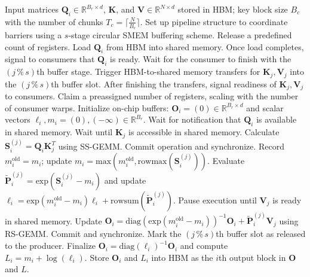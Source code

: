 \begin{enumerate}
\begin{algorithm}[H]
    \caption{\small\label{alg:flash3_wgmma_ws_only}\textsc{FlashAttention-3} forward pass \textbf{excluding} intra-consumer overlap -- CTA perspective}
    \begin{algorithmic}[1]
\REQUIRE Input matrices $\mathbf{Q}_i \in \mathbb{R}^{B_r \times d}$, $\mathbf{K}$, and $\mathbf{V} \in \mathbb{R}^{N \times d}$ stored in HBM; key block size $B_c$ with the number of chunks $T_c = \lceil \frac{N}{B_c} \rceil$.
\STATE Set up pipeline structure to coordinate barriers using a $s$-stage circular SMEM buffering scheme.
\STATE Release a predefined count of registers.
\STATE Load $\mathbf{Q}_i$ from HBM into shared memory.
\STATE Once load completes, signal to consumers that $\mathbf{Q}_i$ is ready.
    \STATE Wait for the consumer to finish with the $(j\,\%\,s)$th buffer stage.
    \STATE Trigger HBM-to-shared memory transfers for $\mathbf{K}_j, \mathbf{V}_j$ into the $(j\,\%\,s)$th buffer slot.
    \STATE After finishing the transfers, signal readiness of $\mathbf{K}_j, \mathbf{V}_j$ to consumers.
\ENDFOR
\ELSE \STATE Claim a preassigned number of registers, scaling with the number of consumer warps.
\STATE Initialize on-chip buffers: $\mathbf{O}_i = (0) \in \mathbb{R}^{B_r \times d}$ and scalar vectors $\ell_i, m_i = (0), (-\infty) \in \mathbb{R}^{B_r}$.
\STATE Wait for notification that $\mathbf{Q}_i$ is available in shared memory.
\STATE Wait until $\mathbf{K}_j$ is accessible in shared memory.
\STATE Calculate $\mathbf{S}_i^{(j)} = \mathbf{Q}_i \mathbf{K}_j^T$ using SS-GEMM. Commit operation and synchronize. \label{alg:ws_only_gemm1}
\STATE Record $m_i^{\mathrm{old}} = m_i$; update $m_i = \mathrm{max}(m_i^{\mathrm{old}}, \mathrm{rowmax}(\mathbf{S}_i^{(j)}))$. \label{code-ws:softmax_start}
\STATE Evaluate $\widetilde{\mathbf{P}}_i^{(j)} = \mathrm{exp}(\mathbf{S}_i^{(j)} - m_i)$ and update $\ell_i = \mathrm{exp}(m_i^{\mathrm{old}} - m_i) \ell_i + \mathrm{rowsum}(\widetilde{\mathbf{P}}_i^{(j)})$. \label{code-ws:softmax_end}
\STATE Pause execution until $\mathbf{V}_j$ is ready in shared memory.
\STATE Update $\mathbf{O}_i = \mathrm{diag}(\mathrm{exp}(m_i^{\mathrm{old}} - m_i))^{-1} \mathbf{O}_i + \widetilde{\mathbf{P}}_i^{(j)} \mathbf{V}_j$ using RS-GEMM. Commit and synchronize. \label{alg:ws_only_gemm2}
\STATE Mark the $(j\,\%\,s)$th buffer slot as released to the producer.
\ENDFOR
\STATE Finalize $\mathbf{O}_i = \mathrm{diag}(\ell_i)^{-1} \mathbf{O}_i$ and compute $L_i = m_i + \log(\ell_i)$.
\STATE Store $\mathbf{O}_i$ and $L_i$ into HBM as the $i$th output block in $\mathbf{O}$ and $L$.
\ENDIF
\end{algorithmic}
\end{algorithm}


\end{enumerate}
